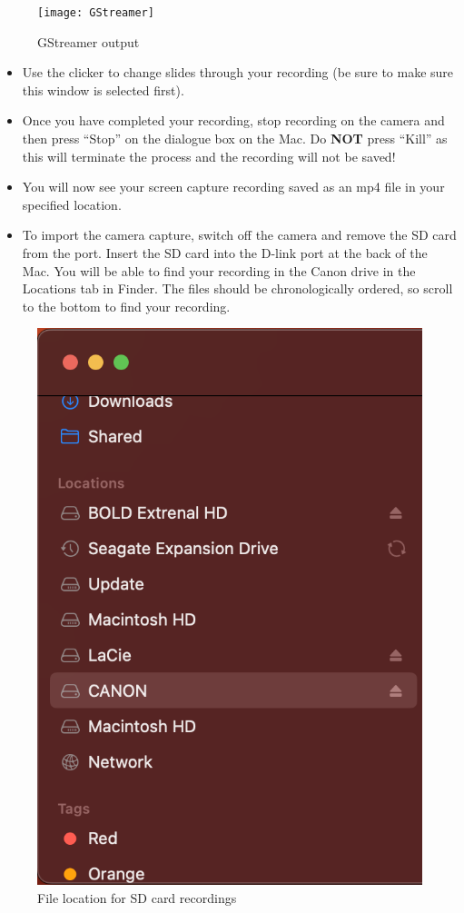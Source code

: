 \documentclass[
]{book}
\begin{document}
\begin{figure}

{\centering \texttt{[image: GStreamer]} 

}

\caption{GStreamer output}\label{fig:gstreamer}
\end{figure}

\begin{itemize}
\item
  Use the clicker to change slides through your recording (be sure to make sure this window is selected first).
\item
  Once you have completed your recording, stop recording on the camera and then press ``Stop'' on the dialogue box on the Mac. Do \textbf{NOT} press ``Kill'' as this will terminate the process and the recording will not be saved!
\item
  You will now see your screen capture recording saved as an mp4 file in your specified location.
\item
  To import the camera capture, switch off the camera and remove the SD card from the port. Insert the SD card into the D-link port at the back of the Mac. You will be able to find your recording in the Canon drive in the Locations tab in Finder. The files should be chronologically ordered, so scroll to the bottom to find your recording.
\end{itemize}

\begin{figure}

{\centering \includegraphics[width=0.6\linewidth]{Canon} 

}

\caption{File location for SD card recordings}\label{fig:canon}
\end{figure}
\end{document}
